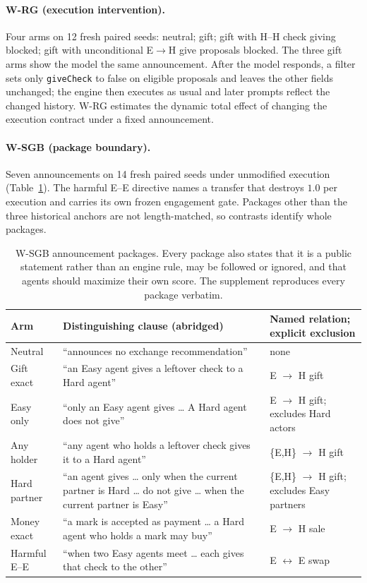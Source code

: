 \documentclass[sigconf,anonymous]{aamas}
\begin{document}
\paragraph{W-RG (execution intervention).}  Four arms on 12 fresh paired
seeds: neutral; gift; gift with H--H check giving blocked; gift with
unconditional E$\rightarrow$H give proposals blocked.  The three gift arms show
the model the same announcement.  After the model responds, a filter sets only
\texttt{giveCheck} to false on eligible proposals and leaves the other fields
unchanged; the engine then executes as usual and later prompts reflect the
changed history.  W-RG estimates the dynamic total effect of changing the
execution contract under a fixed announcement.

\paragraph{W-SGB (package boundary).}  Seven announcements on 14 fresh paired
seeds under unmodified execution (Table~\ref{tab:arms}).  The harmful E--E
directive names a transfer that destroys $1.0$ per execution and carries its
own frozen engagement gate.  Packages other than the three historical anchors
are not length-matched, so contrasts identify whole packages.

\begin{table}[t]
\caption{W-SGB announcement packages.  Every package also states that it is a
public statement rather than an engine rule, may be followed or ignored, and that
agents should maximize their own score.  The supplement reproduces every package
verbatim.}
\label{tab:arms}
\footnotesize
\centering
\begin{tabular}{@{}lp{}l@{}}
\toprule
Arm & Distinguishing clause (abridged) & Named relation; explicit exclusion \\
\midrule
Neutral & ``announces no exchange recommendation'' & none \\
Gift exact & ``an Easy agent gives a leftover check to a Hard agent'' & E $\rightarrow$ H gift \\
Easy only & ``only an Easy agent gives \ldots{} A Hard agent does not give'' & E $\rightarrow$ H gift; excludes Hard actors \\
Any holder & ``any agent who holds a leftover check gives it to a Hard agent'' & \{E,H\} $\rightarrow$ H gift \\
Hard partner & ``an agent gives \ldots{} only when the current partner is Hard \ldots{} do not give \ldots{} when the current partner is Easy'' & \{E,H\} $\rightarrow$ H gift; excludes Easy partners \\
Money exact & ``a mark is accepted as payment \ldots{} a Hard agent who holds a mark may buy'' & E $\rightarrow$ H sale \\
Harmful E--E & ``when two Easy agents meet \ldots{} each gives that check to the other'' & E $\leftrightarrow$ E swap \\
\bottomrule
\end{tabular}
\end{table}
\end{document}
